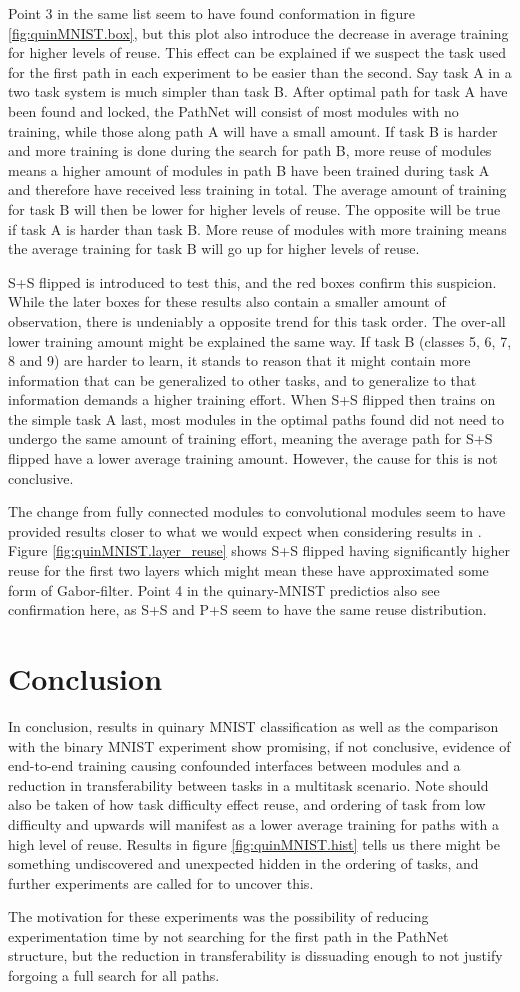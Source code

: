 Point 3 in the same list seem to have found conformation in figure \ref{fig:quinMNIST.box}, but this plot also introduce the decrease in average training for higher levels of reuse. This effect can be explained if we suspect the task used for the first path in each experiment to be easier than the second. Say task A in a two task system is much simpler than task B. After optimal path for task A have been found and locked, the PathNet will consist of most modules with no training, while those along path A will have a small amount. If task B is harder and more training is done during the search for path B, more reuse of modules means a higher amount of modules in path B have been trained during task A and therefore have received less training in total. The average amount of training for task B will then be lower for higher levels of reuse. 
The opposite will be true if task A is harder than task B. More reuse of modules with more training means the average training for task B will go up for higher levels of reuse. 

S+S flipped is introduced to test this, and the red boxes confirm this suspicion. While the later boxes for these results also contain a smaller amount of observation, there is undeniably a opposite trend for this task order. The over-all lower training amount might be explained the same way. If task B (classes 5, 6, 7, 8 and 9) are harder to learn, it stands to reason that it might contain more information that can be generalized to other tasks, and to generalize to that information demands a higher training effort. When S+S flipped then trains on the simple task A last, most modules in the optimal paths found did not need to undergo the same amount of training effort, meaning the average path for S+S flipped have a lower average training amount. However, the cause for this is not conclusive. 

The change from fully connected modules to convolutional modules seem to have provided results closer to what we would expect when considering results in \cite{yosinski2014transferable}. Figure \ref{fig:quinMNIST.layer_reuse} shows S+S flipped having significantly higher reuse for the first two layers which might mean these have approximated some form of Gabor-filter. Point 4 in the quinary-MNIST predictios also see confirmation here, as S+S and P+S seem to have the same reuse distribution. 

\section{Conclusion}
In conclusion, results in quinary MNIST classification as well as the comparison with the binary MNIST experiment show promising, if not conclusive, evidence of end-to-end training causing confounded interfaces between modules and a reduction in transferability between tasks in a multitask scenario. Note should also be taken of how task difficulty effect reuse, and ordering of task from low difficulty and upwards will manifest as a lower average training for paths with a high level of reuse. Results in figure \ref{fig:quinMNIST.hist} tells us there might be something undiscovered and unexpected hidden in the ordering of tasks, and further experiments are called for to uncover this. 

The motivation for these experiments was the possibility of reducing experimentation time by not searching for the first path in the PathNet structure, but the reduction in transferability is dissuading enough to not justify forgoing a full search for all paths. 


